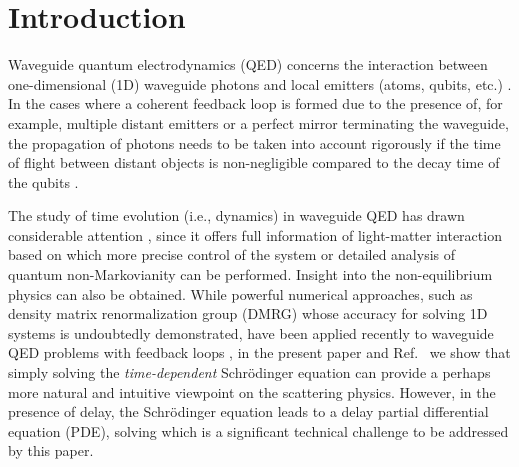 \documentclass[final,1p,times]{elsarticle}
\begin{document}
\begin{small}
\end{small}


\section{Introduction}
Waveguide quantum electrodynamics (QED) concerns the interaction between one-dimensional (1D) waveguide photons and local emitters (atoms, qubits, etc.) \cite{LodahlRMP15,RoyRMP17,NohRPP16,LiaoPhyScr16,GuPR17}. In the cases where a coherent feedback loop is formed due to the presence of, for example, multiple distant emitters or a perfect mirror terminating the waveguide, the propagation of photons needs to be taken into account rigorously if the time of flight between distant objects is non-negligible compared to the decay time of the qubits \cite{ZhengPRL13,TufarelliPRA14,FangPRA15,GrimsmoPRL15,RamosPRA16,PichlerPRL16}.

The study of time evolution (i.e., dynamics) in waveguide QED has drawn considerable attention \cite{LongoPRL10, LongoPRA11, PeropadrePRL13, %
	ZuecoFD14,ShiPRA15, KocabasPRA16, KocabasOL16, MirzaPRA16b, GuoPRA17, WhalenQST17,GuimondQST17}, 
since it offers full information of light-matter interaction based on which more precise control of the system or detailed analysis of quantum non-Markovianity \cite{RivasRPP14,BreuerRMP16,deVegaRMP17} can be performed. Insight into the non-equilibrium physics can also be obtained. While powerful numerical approaches, such as density matrix renormalization group (DMRG) \cite{WhitePRL92,SchollwockRMP05,SchollwockAnnPhys11} whose accuracy for solving 1D systems is undoubtedly demonstrated, have been applied recently to waveguide QED problems with feedback loops \cite{PichlerPRL16,GuimondQST17}, in the present paper and Ref.~\cite{FangNJP18} we show that simply solving the \emph{time-dependent} Schr\"{o}dinger equation can provide a perhaps more natural and intuitive viewpoint on the scattering physics.
However, in the presence of delay, the Schr\"{o}dinger equation leads to a delay partial differential equation (PDE), solving which is a significant technical challenge to be addressed by this paper.
\end{document}
